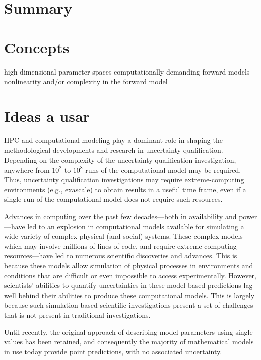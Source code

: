 \section{Summary}

\section{Concepts}
high-dimensional parameter spaces %
computationally demanding forward models 
nonlinearity and/or complexity in the forward model


%

\section{Ideas a usar}
HPC and computational modeling play a dominant role in shaping the methodological developments and research in uncertainty qualification. Depending on the complexity of the uncertainty qualification investigation, anywhere from $10^{2}$ to $10^{8}$ runs of the computational model may be required. Thus, uncertainty qualification investigations may require extreme-computing environments (e.g., exascale) to obtain results in a useful time frame, even if a single run of the computational model does not require such resources. 

Advances in computing over the past few decades—both in availability and power—have led to an explosion in computational models available for simulating a wide variety of complex physical (and social) systems. These complex models—which may involve millions of lines of code, and require extreme-computing resources—have led to numerous scientific discoveries and advances. This is because these models allow simulation of physical processes in environments and conditions that are difficult or even impossible to access experimentally. However, scientists’ abilities to quantify uncertainties in these model-based predictions lag well behind their abilities to produce these computational models. This is largely because such simulation-based scientific investigations present a set of challenges that is not present in traditional investigations.


Until recently, the original approach of describing model parameters using single values has been retained, and consequently the majority of mathematical models in use today provide point predictions, with no associated uncertainty. \cite{Johnstone2015}

